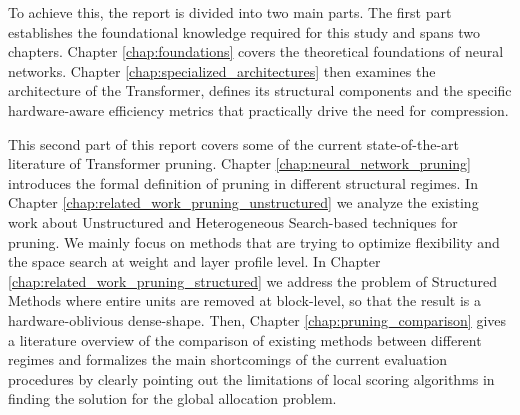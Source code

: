 To achieve this, the report is divided into two main parts. The first part establishes the foundational knowledge required for this study and spans two chapters. Chapter \ref{chap:foundations} covers the theoretical foundations of neural networks. Chapter \ref{chap:specialized_architectures} then examines the architecture of the Transformer, defines its structural components and the specific hardware-aware efficiency metrics that practically drive the need for compression.

This second part of this report covers some of the current state-of-the-art literature of Transformer pruning. Chapter \ref{chap:neural_network_pruning} introduces the formal definition of pruning in different structural regimes. In Chapter \ref{chap:related_work_pruning_unstructured} we analyze the existing work about Unstructured and Heterogeneous Search-based techniques for pruning. We mainly focus on methods that are trying to optimize flexibility and the space search at weight and layer profile level. In Chapter \ref{chap:related_work_pruning_structured} we address the problem of Structured Methods where entire units are removed at block-level, so that the result is a hardware-oblivious dense-shape. Then, Chapter \ref{chap:pruning_comparison} gives a literature overview of the comparison of existing methods between different regimes and formalizes the main shortcomings of the current evaluation procedures by clearly pointing out the limitations of local scoring algorithms in finding the solution for the global allocation problem.